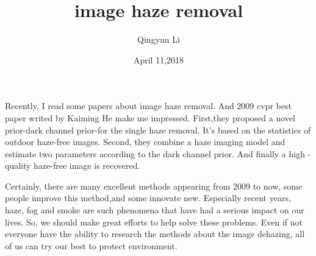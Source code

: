 \documentclass{article}
\author{Qingyun Li}
\date{April 11,2018}
\title{image haze removal}
\begin{document}
\maketitle
\par Recently, I read some papers about image haze removal. And 2009 cvpr best paper writed by Kaiming He make me impressed. First,they proposed a novel prior-dark channel prior-for the single haze removal. It's based on the statistics of outdoor haze-free images. Second, they combine a haze imaging model and estimate two parameters according to the dark channel prior. And finally a high -quality haze-free image is recovered.
\par Certainly, there are many excellent methods appearing from 2009 to now, some people improve this method,and some innovate new. Especially recent years, haze, fog and smoke are such phenomena that have had a serious impact on our lives. So, we should make great efforts to help solve these problems. Even if not everyone have the ability to research the methods about the image dehazing, all of us can try our best to protect environment.
\end{document}
